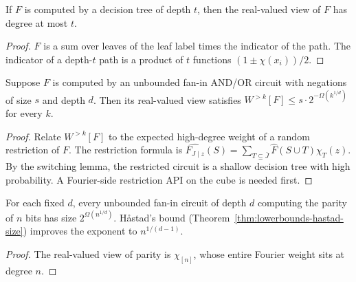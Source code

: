 \begin{theorem}
  \label{thm:analysis-decision-tree-degree}
  \notready
  If $F$ is computed by a decision tree of depth $t$, then the real-valued view of
  $F$ has degree at most $t$.
\end{theorem}
\begin{proof}
  $F$ is a sum over leaves of the leaf label times the indicator of the path. The
  indicator of a depth-$t$ path is a product of $t$ functions $(1 \pm \chi(x_i))/2$.
\end{proof}

\begin{theorem}
  \label{thm:analysis-lmn}
  \notready
  Suppose $F$ is computed by an unbounded fan-in AND/OR circuit with negations of
  size $s$ and depth $d$. Then its real-valued view satisfies
  $W^{>k}[F] \le s \cdot 2^{-\Omega(k^{1/d})}$ for every $k$.
\end{theorem}
\begin{proof}
  Relate $W^{>k}[F]$ to the expected high-degree weight of a random restriction
  of $F$. The restriction formula is
  $\widehat{F_{J \mid z}}(S) = \sum_{T \subseteq \bar J} \widehat{F}(S \cup T)\chi_T(z)$.
  By the switching lemma, the restricted circuit is a shallow decision tree with
  high probability. A Fourier-side restriction API on the cube is needed first.
\end{proof}

\begin{corollary}
  \label{cor:analysis-lmn-parity}
  \notready
  For each fixed $d$, every unbounded fan-in circuit of depth $d$ computing the
  parity of $n$ bits has size $2^{\Omega(n^{1/d})}$. Håstad's bound
  (Theorem~\ref{thm:lowerbounds-hastad-size}) improves the exponent to
  $n^{1/(d-1)}$.
\end{corollary}
\begin{proof}
  The real-valued view of parity is $\chi_{[n]}$, whose entire Fourier weight
  sits at degree $n$.
\end{proof}

